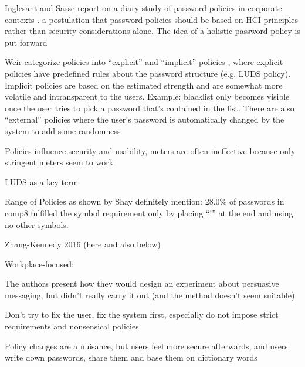 	Inglesant and Sasse report on a diary study of password policies in corporate contexts \cite{Inglesant2010TrueCostOfUnusablePolicies}. a postulation that password policies should be based on HCI principles rather than security considerations alone. The idea of a holistic password policy is put forward 
	
	 
	
	

	
	
	Weir \etal categorize policies into ``explicit'' and ``implicit'' policies \cite{Weir2010MetricsPolicies}, where explicit policies have predefined rules about the password structure (e.g. LUDS policy). Implicit policies are based on the estimated strength and are somewhat more volatile and intransparent to the users. Example: blacklist only becomes visible once the user tries to pick a password that's contained in the list. There are also ``external'' policies where the user's password is automatically changed by the system to add some randomness
	
	
	Policies influence security and usability, meters are often ineffective because only stringent meters seem to work \cite{Ur2012HelpingUsersCreateBetterPasswords}
	
	LUDS as a key term \cite{Wheeler2016zxcvbn}
	
		
	Range of Policies as shown by Shay \cite{Shay2014CanLongPasswordsBeSecureAndUsable}
	definitely mention: 28.0\% of passwords in comp8 fulfilled the symbol requirement only by placing ``!'' at the end and using no other symbols. 
	
	Zhang-Kennedy 2016 (here and also below) \cite{ZhangKennedy2016RevisitingPasswordRules}
	
	
	Workplace-focused: 
	
	
	The authors present how they would design an experiment about persuasive messaging, but didn't really carry it out (and the method doesn't seem suitable) \cite{Zakaria2013DesigningEffectiveSecurityMessages}
	
	Don't try to fix the user, fix the system first, especially do not impose strict requirements and nonsensical policies \cite{Florencio2014AdministratorsGuide} 
	
	Policy changes are a nuisance, but users feel more secure afterwards, and users write down passwords, share them and base them on dictionary words 	\cite{Shay2010EncounteringPasswordRequirements}
	

